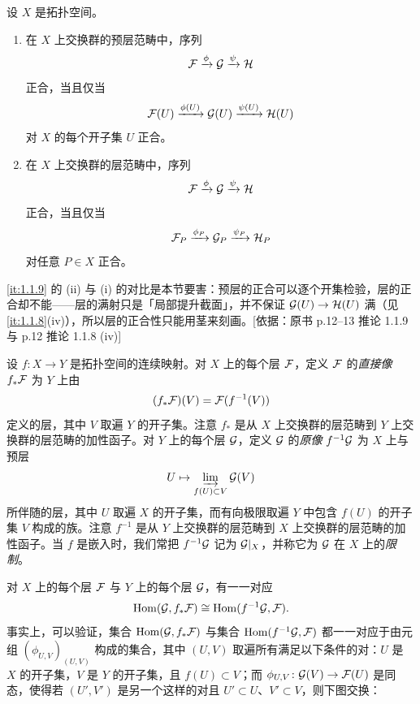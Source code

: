 \begin{corollary}\label{it:1.1.9}
设 $X$ 是拓扑空间。
\begin{enumerate}[label=(\roman*),leftmargin=2.8em]
  \item 在 $X$ 上交换群的预层范畴中，序列
  \[
  \mathcal{F}\xrightarrow{\phi}\mathcal{G}\xrightarrow{\psi}\mathcal{H}
  \]
  正合，当且仅当
  \[
  \mathcal{F}(U)\xrightarrow{\phi(U)}\mathcal{G}(U)\xrightarrow{\psi(U)}\mathcal{H}(U)
  \]
  对 $X$ 的每个开子集 $U$ 正合。
  \item 在 $X$ 上交换群的层范畴中，序列
  \[
  \mathcal{F}\xrightarrow{\phi}\mathcal{G}\xrightarrow{\psi}\mathcal{H}
  \]
  正合，当且仅当
  \[
  \mathcal{F}_P\xrightarrow{\phi_P}\mathcal{G}_P\xrightarrow{\psi_P}\mathcal{H}_P
  \]
  对任意 $P\in X$ 正合。
\end{enumerate}
\end{corollary}
\begin{tnote}
\ref{it:1.1.9} 的 (ii) 与 (i) 的对比是本节要害：预层的正合可以逐个开集检验，层的正合却不能——层的满射只是「局部提升截面」，并不保证 $\mathcal{G}(U)\to\mathcal{H}(U)$ 满（见 \ref{it:1.1.8}(iv)），所以层的正合性只能用茎来刻画。[依据：原书 p.12–13 推论 1.1.9 与 p.12 推论 1.1.8 (iv)]
\end{tnote}

设 $f\colon X\to Y$ 是拓扑空间的连续映射。对 $X$ 上的每个层 $\mathcal{F}$，定义 $\mathcal{F}$ 的\emph{直接像} $f_*\mathcal{F}$ 为 $Y$ 上由
\[
(f_*\mathcal{F})(V)=\mathcal{F}(f^{-1}(V))
\]
定义的层，其中 $V$ 取遍 $Y$ 的开子集。注意 $f_*$ 是从 $X$ 上交换群的层范畴到 $Y$ 上交换群的层范畴的加性函子。对 $Y$ 上的每个层 $\mathcal{G}$，定义 $\mathcal{G}$ 的\emph{原像} $f^{-1}\mathcal{G}$ 为 $X$ 上与预层
\[
U\mapsto\varinjlim_{f(U)\subset V}\mathcal{G}(V)
\]
所伴随的层，其中 $U$ 取遍 $X$ 的开子集，而有向极限取遍 $Y$ 中包含 $f(U)$ 的开子集 $V$ 构成的族。注意 $f^{-1}$ 是从 $Y$ 上交换群的层范畴到 $X$ 上交换群的层范畴的加性函子。当 $f$ 是嵌入时，我们常把 $f^{-1}\mathcal{G}$ 记为 $\mathcal{G}|_X$，并称它为 $\mathcal{G}$ 在 $X$ 上的\emph{限制}。

对 $X$ 上的每个层 $\mathcal{F}$ 与 $Y$ 上的每个层 $\mathcal{G}$，有一一对应
\[
\operatorname{Hom}(\mathcal{G},f_*\mathcal{F})\cong\operatorname{Hom}(f^{-1}\mathcal{G},\mathcal{F}).
\]
事实上，可以验证，集合 $\operatorname{Hom}(\mathcal{G},f_*\mathcal{F})$ 与集合 $\operatorname{Hom}(f^{-1}\mathcal{G},\mathcal{F})$ 都一一对应于由元组 $(\phi_{U,V})_{(U,V)}$ 构成的集合，其中 $(U,V)$ 取遍所有满足以下条件的对：$U$ 是 $X$ 的开子集，$V$ 是 $Y$ 的开子集，且 $f(U)\subset V$；而 $\phi_{U,V}\colon\mathcal{G}(V)\to\mathcal{F}(U)$ 是同态，使得若 $(U',V')$ 是另一个这样的对且 $U'\subset U$、$V'\subset V$，则下图交换：
\begin{center}
\end{center}

